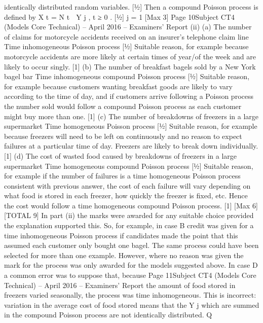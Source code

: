 \documentclass[a4paper,12pt]{article}
\begin{document}
identically distributed random variables. [1⁄2]
Then a compound Poisson process is defined by
X t =
N t
 Y j , t ≥ 0 .
[1⁄2]
j = 1
[Max 3]
Page 10Subject CT4 (Models Core Technical) – April 2016 – Examiners’ Report
(ii)
(a)
The number of claims for motorcycle accidents received on an
insurer’s telephone claim line
Time inhomogeneous Poisson process
[1⁄2]
Suitable reason, for example because motorcycle accidents are more
likely at certain times of year/of the week and are likely to occur
singly.
[1]
(b)
The number of breakfast bagels sold by a New York bagel bar
Time inhomogeneous compound Poisson process
[1⁄2]
Suitable reason, for example because customers wanting breakfast
goods are likely to vary according to the time of day, and if customers
arrive following a Poisson process the number sold would follow a
compound Poisson process as each customer might buy more than one.
[1]
(c)
The number of breakdowns of freezers in a large supermarket
Time homogeneous Poisson process
[1⁄2]
Suitable reason, for example because freezers will need to be left on
continuously and no reason to expect failures at a particular time of
day. Freezers are likely to break down individually.
[1]
(d)
The cost of wasted food caused by breakdowns of freezers in a
large supermarket
Time homogeneous compound Poisson process
[1⁄2]
Suitable reason, for example if the number of failures is a time
homogeneous Poisson process consistent with previous answer, the
cost of each failure will vary depending on what food is stored in each
freezer, how quickly the freezer is fixed, etc. Hence the cost would
follow a time homogeneous compound Poisson process.
[1]
[Max 6]
[TOTAL 9]
In part (ii) the marks were awarded for any suitable choice provided the
explanation supported this. So, for example, in case B credit was given for a
time inhomogeneous Poisson process if candidates made the point that this
assumed each customer only bought one bagel. The same process could
have been selected for more than one example. However, where no reason
was given the mark for the process was only awarded for the models
suggested above. In case D a common error was to suppose that, because
Page 11Subject CT4 (Models Core Technical) – April 2016 – Examiners’ Report
the amount of food stored in freezers varied seasonally, the process was time
inhomogeneous. This is incorrect: variation in the average cost of food stored
means that the Y j which are summed in the compound Poisson process are
not identically distributed.
Q
\end{document}
